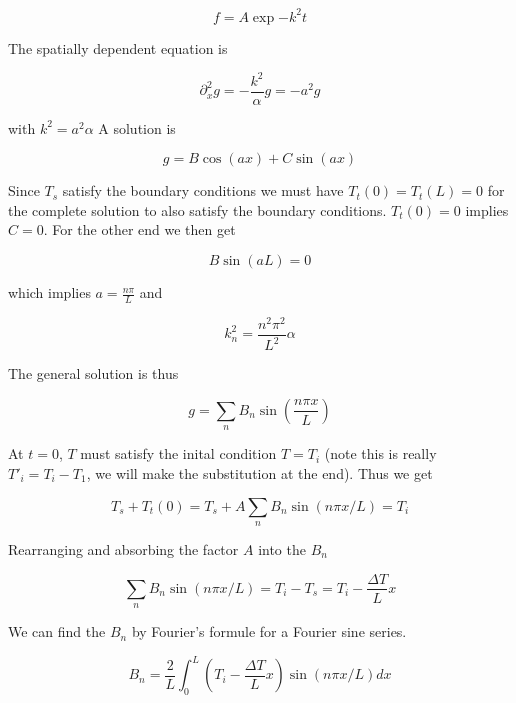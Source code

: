 \documentclass{article}
\begin{document}
\begin{equation}
f = A \exp{-k^2 t}
\end{equation}

The spatially dependent equation is

\begin{equation}
\partial_x^2 g = -\frac{k^2}{\alpha}g = -a^2 g
\end{equation}

with $k^2 = a^2 \alpha$ A solution is

\begin{equation}
g = B\cos(ax) + C \sin(ax)
\end{equation}

Since $T_s$ satisfy the boundary conditions we must have $T_t(0) = T_t(L) =0$ for the complete solution to also satisfy the boundary conditions. $T_t(0) =0$ implies $C = 0$. For the other end we then get

\begin{equation}
B \sin(aL) = 0
\end{equation}

which implies $a  = \frac{ n\pi}{L}$ and

\begin{equation}
k_n^2 = \frac{n^2\pi^2}{L^2}\alpha
\end{equation} 

The general solution is thus

\begin{equation}
g = \sum_n B_n \sin(\frac{n\pi x}{L}) 
\end{equation}


At $t=0$, $T$ must satisfy the inital condition $T = T_i$ (note this is really $T'_i = T_i - T_1$, we will make the substitution at the end). Thus we get

\begin{equation}
T_s + T_t(0) = T_s + A\sum_n B_n \sin(n\pi x/L) = T_i
\end{equation}

Rearranging and absorbing the factor $A$ into the $B_n$

\begin{equation}
\sum_n B_n \sin(n\pi x/L) = T_i -T_s = T_i - \frac{\Delta T}{L}x
\end{equation}

We can find the $B_n$ by Fourier's formule for a Fourier sine series.

\begin{equation}
B_n = \frac{2}{L} \int_0^L (T_i-\frac{\Delta T}{L}x) \sin(n\pi x /L) dx 
\end{equation}
\end{document}
